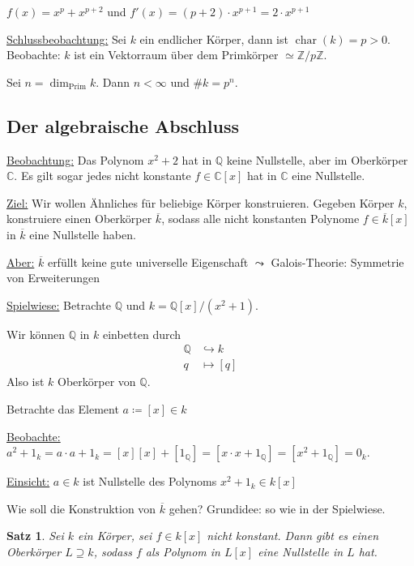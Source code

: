 \documentclass[a4paper,12pt,numbers=noenddot,parskip=full]{scrartcl}
\newcommand{\setZ}{\mathbb{Z}}
\newcommand{\setQ}{\mathbb{Q}}
\newcommand{\setC}{\mathbb{C}}
\newcommand{\heading}{\underline}
\theoremstyle{dotless}
\newtheorem{theorem}{Satz}[section]
\theoremstyle{remark}
\begin{document}
	$f(x) = x^p + x^{p+2}$ und $f'(x) = (p + 2) \cdot x^{p+1} = 2 \cdot x^{p+1}$
	
	\heading{Schlussbeobachtung:} Sei $k$ ein endlicher Körper, dann ist $\operatorname{char}(k) = p > 0$. Beobachte: $k$ ist ein Vektorraum über dem Primkörper $\simeq \setZ / p \setZ$.
	
	Sei $n = \dim_\text{Prim} k$. Dann $n < \infty$ und $\#k = p^n$.
	
	\subsection{Der algebraische Abschluss}
	
	\heading{Beobachtung:} Das Polynom $x^2 + 2$ hat in $\setQ$ keine Nullstelle, aber im Oberkörper $\setC$. Es gilt sogar jedes nicht konstante $f \in \setC[x]$ hat in $\setC$ eine Nullstelle.
	
	\heading{Ziel:} Wir wollen Ähnliches für beliebige Körper konstruieren. Gegeben Körper $k$, konstruiere einen Oberkörper $\overline{k}$, sodass alle nicht konstanten Polynome $f \in \overline{k}[x]$ in $\overline{k}$ eine Nullstelle haben.
	
	\heading{Aber:} $\overline{k}$ erfüllt keine gute universelle Eigenschaft $\leadsto$ Galois-Theorie: Symmetrie von Erweiterungen
	
	\heading{Spielwiese:} Betrachte $\setQ$ und $k = \setQ[x]/(x^2 + 1)$.
	
	Wir können $\setQ$ in $k$ einbetten durch
	\begin{align*}
		\setQ &\hookrightarrow k \\
		q &\mapsto [q]
	\end{align*}
	Also ist $k$ Oberkörper von $\setQ$.
	
	Betrachte das Element $a \coloneqq [x] \in k$
	
	\heading{Beobachte:} $a^2 + 1_k = a \cdot a + 1_k = [x] [x] + [1_\setQ] = [x \cdot x + 1_\setQ] = [x^2 + 1_\setQ] = 0_k$.
	
	\heading{Einsicht:} $a \in k$ ist Nullstelle des Polynoms $x^2 + 1_k \in k[x]$
	
	Wie soll die Konstruktion von $\overline{k}$ gehen? Grundidee: so wie in der Spielwiese.
	
	\begin{theorem}
		Sei $k$ ein Körper, sei $f \in k[x]$ nicht konstant. Dann gibt es einen Oberkörper $L \supseteq k$, sodass $f$ als Polynom in $L[x]$ eine Nullstelle in $L$ hat.
	\end{theorem}
\end{document}
